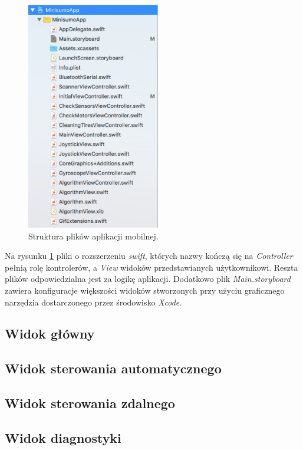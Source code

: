 \begin{figure}[H]
	\centering
		\includegraphics[width=0.75\linewidth, height=10cm, keepaspectratio]{pic05/structure.png}
	\caption{Struktura plików aplikacji mobilnej.}
	\label{fig:structure}	
\end{figure}

Na rysunku \ref{fig:structure} pliki o rozszerzeniu \textit{swift}, których nazwy kończą się na \textit{Controller} pełnią rolę kontrolerów, a \textit{View} widoków przedstawianych użytkownikowi. Reszta plików odpowiedzialna jest za logikę aplikacji. Dodatkowo plik \textit{Main.storyboard} zawiera konfiguracje większości widoków stworzonych przy użyciu graficznego narzędzia dostarczonego przez środowisko \textit{Xcode}.

\subsection{Widok główny}
\subsection{Widok sterowania automatycznego}
\subsection{Widok sterowania zdalnego}
\subsection{Widok diagnostyki}